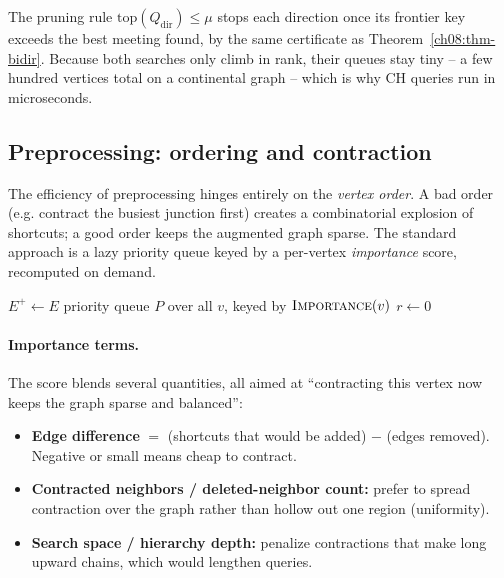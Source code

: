 The pruning rule $\mathrm{top}(Q_{\mathrm{dir}})\le\mu$ stops each direction once
its frontier key exceeds the best meeting found, by the same certificate as
Theorem~\ref{ch08:thm-bidir}. Because both searches only climb in rank, their
queues stay tiny -- a few hundred vertices total on a continental graph -- which
is why CH queries run in microseconds.

\subsection{Preprocessing: ordering and contraction}

The efficiency of preprocessing hinges entirely on the \emph{vertex order}. A bad order (e.g. contract the busiest
junction first) creates a combinatorial explosion of shortcuts; a good order
keeps the augmented graph sparse. The standard approach is a lazy priority queue
keyed by a per-vertex \emph{importance} score, recomputed on demand.

\begin{algorithm}[H]
\DontPrintSemicolon
{}
$E^{+}\gets E$\;
priority queue $P$ over all $v$, keyed by $\textsc{Importance}(v)$\;
$r\gets 0$\;
\caption{CH preprocessing (lazy vertex ordering with witness search)}
\label{ch08:alg-ch-prep}
\end{algorithm}

\paragraph{Importance terms.} The score blends several quantities, all aimed at
``contracting this vertex now keeps the graph sparse and balanced'':
\begin{itemize}
  \item \textbf{Edge difference} $=$ (shortcuts that would be added) $-$ (edges
        removed). Negative or small means cheap to contract.
  \item \textbf{Contracted neighbors / deleted-neighbor count:} prefer to spread
        contraction over the graph rather than hollow out one region (uniformity).
  \item \textbf{Search space / hierarchy depth:} penalize contractions that make
        long upward chains, which would lengthen queries.
\end{itemize}

